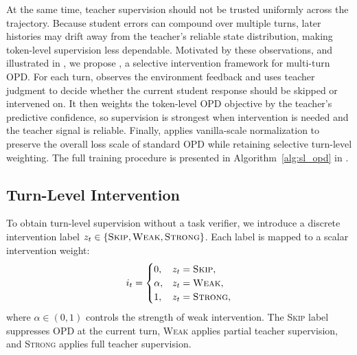 At the same time, teacher supervision should not be trusted uniformly across the trajectory.
%
Because student errors can compound over multiple turns, later histories may drift away from the teacher's reliable state distribution, making token-level supervision less dependable.
%
Motivated by these observations, and illustrated in , we propose \ours{}, a selective intervention framework for multi-turn OPD.
%
For each turn, \ours{} observes the environment feedback and uses teacher judgment to decide whether the current student response should be skipped or intervened on.
%
It then weights the token-level OPD objective by the teacher's predictive confidence, so supervision is strongest when intervention is needed and the teacher signal is reliable.
%
Finally, \ours{} applies vanilla-scale normalization to preserve the overall loss scale of standard OPD while retaining selective turn-level weighting.
%
The full training procedure is presented in Algorithm~\ref{alg:sl_opd} in .

\subsection{Turn-Level Intervention}
\label{sec:method_intervention}

To obtain turn-level supervision without a task verifier, we introduce a discrete intervention label $z_t\in\{\textsc{Skip},\textsc{Weak},\textsc{Strong}\}$.
%
Each label is mapped to a scalar intervention weight:
\begin{equation}
\label{eq:intervention_weight}
i_t =
\begin{cases}
0, & z_t=\textsc{Skip},\\
\alpha, & z_t=\textsc{Weak},\\
1, & z_t=\textsc{Strong},
\end{cases}
\end{equation}
where $\alpha\in(0,1)$ controls the strength of weak intervention.
%
The \textsc{Skip} label suppresses OPD at the current turn, \textsc{Weak} applies partial teacher supervision, and \textsc{Strong} applies full teacher supervision.

